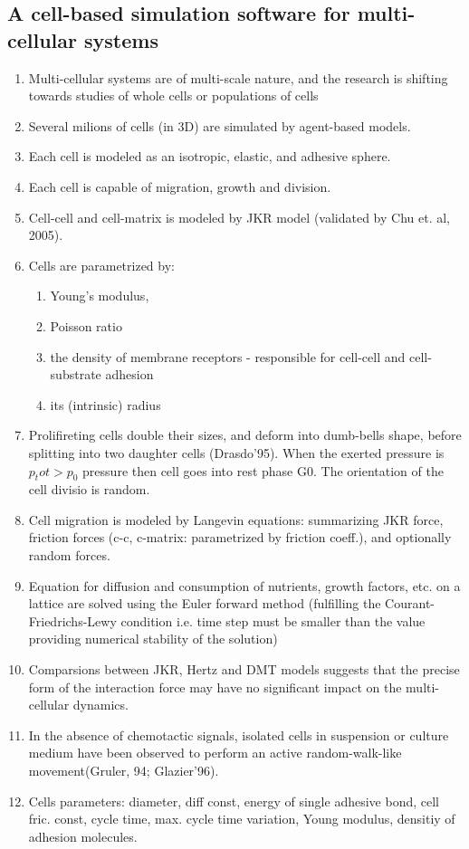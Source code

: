 \documentclass[10pt,a4paper]{article}
\begin{document}
\subsection{A cell-based simulation software for multi-cellular systems \cite{dd:10}}
\begin{enumerate}
 \item Multi-cellular systems are of multi-scale nature, and the research is shifting towards studies of whole cells or populations of cells
 \item Several milions of cells (in 3D) are simulated by  agent-based models.
 \item Each cell is modeled as an isotropic, elastic, and adhesive sphere.
 \item Each cell is capable of migration, growth and division.
 \item Cell-cell and cell-matrix is modeled by JKR model (validated by Chu et. al, 2005).
 \item Cells are parametrized by: 
 \begin{enumerate}
  \item Young's modulus, 
  \item Poisson ratio
  \item the density of membrane receptors -  responsible for cell-cell and cell-substrate adhesion 
  \item its (intrinsic) radius
 \end{enumerate}
 \item Prolifireting cells double their sizes, and deform into dumb-bells shape, before splitting into two daughter cells (Drasdo'95).
 When the exerted pressure is $p_tot > p_0$ pressure then cell goes into rest phase G0. The orientation of the cell divisio is random.
 
 \item Cell migration is modeled by Langevin equations: summarizing JKR force, friction forces (c-c, c-matrix: parametrized by friction coeff.), and optionally random forces.
 \item Equation for diffusion and consumption of nutrients, growth factors, etc. 
 on a lattice are solved using the Euler forward method 
 (fulfilling the Courant-Friedrichs-Lewy condition i.e. time step must be smaller than the value providing numerical stability of the solution)
 \item Comparsions between JKR, Hertz and DMT models suggests that the  precise form of the interaction force may have no significant impact on the multi-cellular dynamics.
 \item In the absence of chemotactic signals, isolated cells in suspension or culture medium have been observed to perform an active random-walk-like movement(Gruler, 94; Glazier'96).
 \item Cells parameters: diameter, diff const, energy of single adhesive bond, cell fric. const, cycle time, max. cycle time variation, Young modulus, densitiy of adhesion molecules. 
\end{enumerate}
\end{document}
